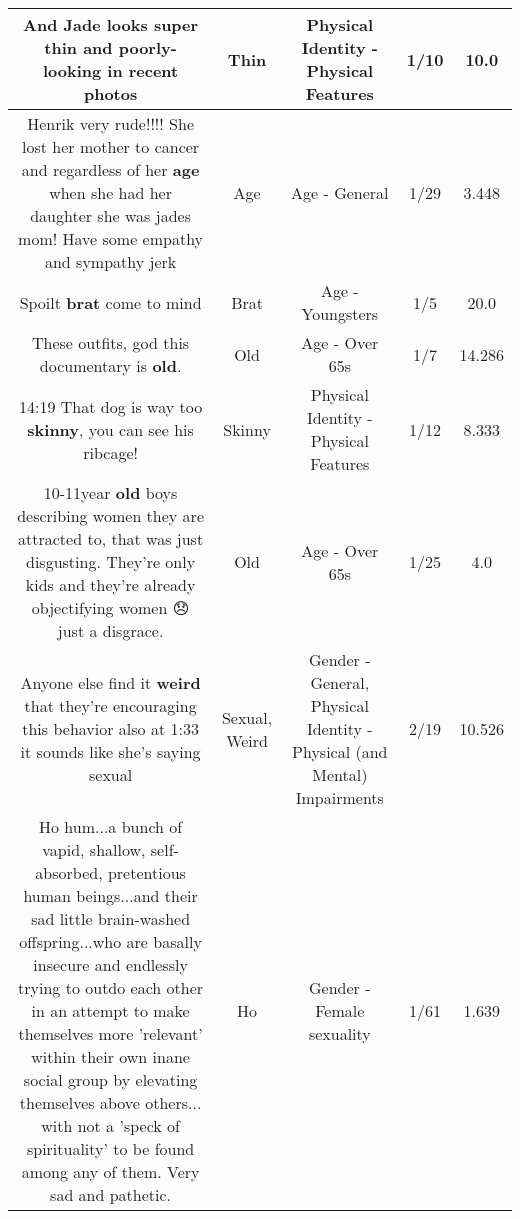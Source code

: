\documentclass[11pt]{article}
\newlength\mylength
\begin{document}
\begin{center}
\begin{longtable}{|C{.65\mylength}|C{.30\mylength}|C{.12\mylength}|C{.12\mylength}|C{.12\mylength}|}
  \small And Jade looks super \textbf{thin} and poorly-looking in recent photos\normalsize   & Thin & Physical Identity - Physical Features & 1/10 & 10.0 \\  \hline
  \small Henrik very rude!!!! She lost her mother to cancer and regardless of her \textbf{age} when she had her daughter she was jades mom! Have some empathy and sympathy jerk\normalsize   & Age & Age - General & 1/29 & 3.448 \\  \hline
  \small Spoilt \textbf{brat} come to mind\normalsize   & Brat & Age - Youngsters & 1/5 & 20.0 \\  \hline
  \small These outfits, god this documentary is \textbf{old}.\normalsize   & Old & Age - Over 65s & 1/7 & 14.286 \\  \hline
  \small 14:19 That dog is way too \textbf{skinny}, you can see his ribcage!\normalsize   & Skinny & Physical Identity - Physical Features & 1/12 & 8.333 \\  \hline
  \small 10-11year \textbf{old} boys describing women they are attracted to, that was just disgusting.  They're only kids and they're already objectifying women 😞  just a disgrace.\normalsize   & Old & Age - Over 65s & 1/25 & 4.0 \\  \hline
  \small Anyone else find it \textbf{weird} that they're encouraging this behavior also at 1:33 it sounds like she's saying sexual\normalsize   & Sexual, Weird & Gender - General, Physical Identity - Physical (and Mental) Impairments & 2/19 & 10.526 \\  \hline
  \small Ho hum...a bunch of vapid, shallow, self-absorbed, pretentious human beings...and their sad little brain-washed offspring...who are basally insecure and endlessly trying to outdo each other in an attempt to make themselves more 'relevant' within their own inane social group by elevating themselves above others... with not a 'speck of spirituality' to be found among any of them.  Very sad and pathetic.\normalsize   & Ho & Gender - Female sexuality & 1/61 & 1.639 \\  \hline

\end{longtable}
\end{center}
\end{document}
